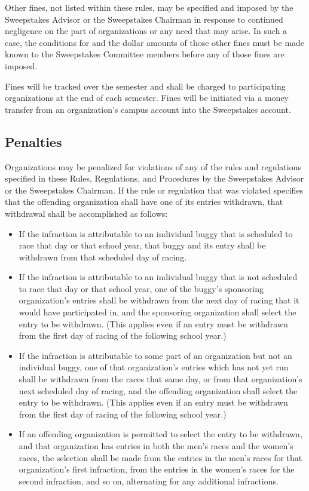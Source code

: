	Other fines, not listed within these rules, may be specified and imposed by the Sweepstakes Advisor or the Sweepstakes Chairman in response to continued negligence on the part of organizations or any need that may arise. In such a case, the conditions for and the dollar amounts of those other fines must be made known to the Sweepstakes Committee members before any of those fines are imposed.

	Fines will be tracked over the semester and shall be charged to participating organizations at the end of each semester. Fines will be initiated via a money transfer from an organization’s campus account into the Sweepstakes account.

\subsection{Penalties}

	Organizations may be penalized for violations of any of the rules and regulations specified in these Rules, Regulations, and Procedures by the Sweepstakes Advisor or the Sweepstakes Chairman. If the rule or regulation that was violated specifies that the offending organization shall have one of its entries withdrawn, that withdrawal shall be accomplished as follows:

	\begin{itemize}

		\item
		If the infraction is attributable to an individual buggy that is scheduled to race that day or that school year, that buggy and its entry shall be withdrawn from that scheduled day of racing.

		\item
		If the infraction is attributable to an individual buggy that is not scheduled to race that day or that school year, one of the buggy's sponsoring organization's entries shall be withdrawn from the next day of racing that it would have participated in, and the sponsoring organization shall select the entry to be withdrawn. (This applies even if an entry must be withdrawn from the first day of racing of the following school year.)

		\item
		If the infraction is attributable to some part of an organization but not an individual buggy, one of that organization's entries which has not yet run shall be withdrawn from the races that same day, or from that organization's next scheduled day of racing, and the offending organization shall select the entry to be withdrawn. (This applies even if an entry must be withdrawn from the first day of racing of the following school year.)

		\item
		If an offending organization is permitted to select the entry to be withdrawn, and that organization has entries in both the men's races and the women's races, the selection shall be made from the entries in the men's races for that organization's first infraction, from the entries in the women's races for the second infraction, and so on, alternating for any additional infractions.

	\end{itemize}

